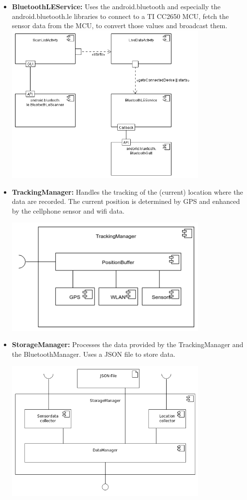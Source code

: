 \begin{itemize}
  \item \textbf{BluetoothLEService:} Uses the android.bluetooth and especially the android.bluetooth.le libraries to connect to a TI CC2650 MCU, fetch the sensor data from the MCU, to convert those values and broadcast them. \\

 \includegraphics[width=0.8\textwidth]{pics/ble_man.png}

  \item \textbf{TrackingManager:} Handles the tracking of the (current) location where the data are recorded. The current position is determined by GPS and enhanced by the cellphone sensor and wifi data.

 \includegraphics[width=0.8\textwidth]{pics/TrackingManager_Composition.png}

  \item \textbf{StorageManager:} Processes the data provided by the TrackingManager and the BluetoothManager. Uses a JSON file to store data.

 \includegraphics[width=0.8\textwidth]{pics/StorageMgr_Composition.png}


\end{itemize}

